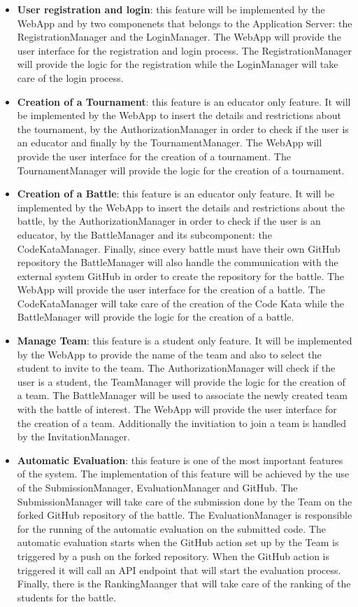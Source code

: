 \begin{itemize}
    \item \textbf{User registration and login}: this feature will be implemented by the WebApp and by two componenets that belongs to the Application Server: the RegistrationManager and the LoginManager. The WebApp will provide the user interface for the registration and login process. The RegistrationManager will provide the logic for the registration while the LoginManager will take care of the login process.
    \item \textbf{Creation of a Tournament}: this feature is an educator only feature. It will be implemented by the WebApp to insert the details and restrictions about the tournament, by the AuthorizationManager in order to check if the user is an educator and finally by the TournamentManager. The WebApp will provide the user interface for the creation of a tournament. The TournamentManager will provide the logic for the creation of a tournament.
    \item \textbf{Creation of a Battle}: this feature is an educator only feature. It will be implemented by the WebApp to insert the details and restrictions about the battle, by the AuthorizationManager in order to check if the user is an educator, by the BattleManager and its subcomponent: the CodeKataManager. Finally, since every battle must have their own GitHub repository the BattleManager will also handle the communication with the external system GitHub in order to create the repository for the battle. The WebApp will provide the user interface for the creation of a battle. The CodeKataManager will take care of the creation of the Code Kata while the BattleManager will provide the logic for the creation of a battle.
    \item \textbf{Manage Team}: this feature is a student only feature. It will be implemented by the WebApp to provide the name of the team and also to select the student to invite to the team. The AuthorizationManager will check if the user is a student, the TeamManager will provide the logic for the creation of a team. The BattleManager will be used to associate the newly created team with the battle of interest. The WebApp will provide the user interface for the creation of a team. Additionally the invitiation to join a team is handled by the InvitationManager.
    \item \textbf{Automatic Evaluation}: this feature is one of the most important features of the system. The implementation of this feature will be achieved by the use of the SubmissionManager, EvaluationManager and GitHub. The SubmissionManager will take care of the submission done by the Team on the forked GitHub repository of the battle. The EvaluationManager is responsible for the running of the automatic evaluation on the submitted code. The automatic evaluation starts when the GitHub action set up by the Team is triggered by a push on the forked repository. When the GitHub action is triggered it will call an API endpoint that will start the evaluation process. Finally, there is the RankingMaanger that will take care of the ranking of the students for the battle.

\end{itemize}
